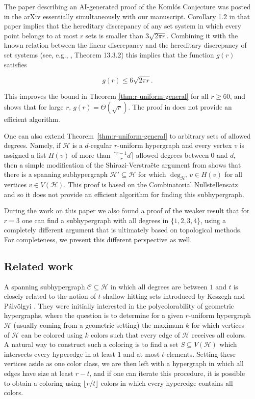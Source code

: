 \documentclass[11pt, a4paper]{article}
\numberwithin{theorem}{section} %
\theoremstyle{remark}
\theoremstyle{definition}
\def\cC{\mathcal{C}}
\def\cH{\mathcal{H}}
\begin{document}
The paper \cite{GFL26} describing an AI-generated 
proof of the Koml\'os Conjecture was posted in the arXiv essentially simultaneously with our manuscript.
Corollary 1.2 in that paper implies that the
hereditary discrepancy of any set system in which every point belongs
to at most $r$ sets is smaller than $3\sqrt{2\pi r}$.
Combining it with the known relation between the linear discrepancy and
the hereditary discrepancy of set systems (see, e.g., \cite{AlonSpencer}, 
Theorem
13.3.2) this implies that the function $g(r)$
satisfies 

$$g(r) \leq 6\sqrt{2 \pi r}.$$ 

This improves the bound in
Theorem \ref{thm:r-uniform-general}
for all $r \geq 60$, and shows that for large
$r$, $g(r)=\Theta(\sqrt r)$. The proof in \cite{GFL26} does not 
provide an efficient algorithm.

One can also extend Theorem~\ref{thm:r-uniform-general} to arbitrary sets of allowed degrees. Namely, if $\cH$ is a $d$-regular $r$-uniform hypergraph and every vertex $v$ is assigned a list $H(v)$ of more than $\lceil \frac{r-1}{r}d\rceil$ allowed degrees between $0$ and $d$, then a simple modification of the Shirazi-Verstra\"ete argument from \cite{ShiraziVerstraete08} shows that there is a spanning subhypergraph $\cH'\subseteq \cH$ for which $\deg_{\cH'}v\in H(v)$ for all vertices $v\in V(\cH)$. This proof is based on the Combinatorial Nullstellensatz \cite{Alon99} and so it does not provide an efficient algorithm for finding this subhypergraph.

During the work on this paper we also found a proof of the weaker result that for $r=3$ one can find a subhypergraph with all degrees in $\{1, 2, 3, 4\}$, using a completely different argument that is ultimately based on topological methods. For completeness, we present this different perspective as well. 

\subsection{Related work}

A spanning subhypergraph $\cC\subseteq \cH$ in which all degrees are between $1$ and $t$ is closely related to the notion of $t$-shallow hitting sets introduced by Keszegh and P\'alv\"olgyi \cite{KeszeghPalvolgyi19}. They were initially interested in the polycolorability of geometric hypergraphs, where the question is to determine for a given $r$-uniform hypergraph $\cH$ (usually coming from a geometric setting) the maximum $k$ for which vertices of $\cH$ can be colored using $k$ colors such that every edge of $\cH$ receives all colors. A natural way to construct such a coloring is to find a set $S\subseteq V(\cH)$ which intersects every hyperedge in at least $1$ and at most $t$ elements. Setting these vertices aside as one color class, we are then left with a hypergraph in which all edges have size at least $r-t$, and if one can iterate this procedure, it is possible to obtain a coloring using $\lfloor r/t\rfloor$ colors in which every hyperedge contains all colors.
\end{document}
